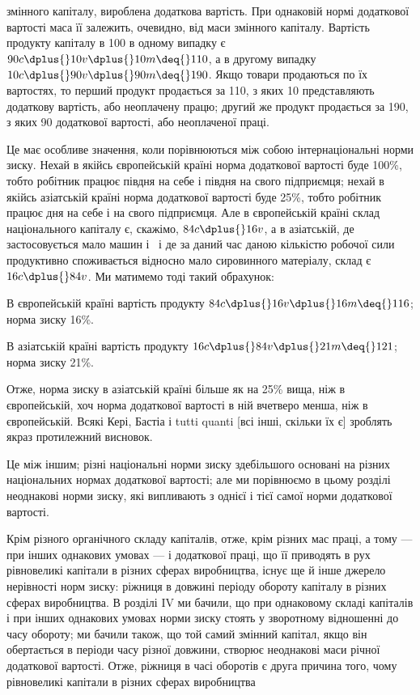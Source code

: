 \parcont{}  %
змінного капіталу, вироблена додаткова вартість. При однаковій
нормі додаткової вартості маса її залежить, очевидно, від маси
змінного капіталу. Вартість продукту капіталу в 100 в одному
випадку є $90 c \dplus{} 10 v \dplus{} 10 m \deq{} 110$, а в другому випадку $10 c \dplus{} 90 v \dplus{} 90 m \deq{} 190$. Якщо товари
продаються по їх вартостях,
то перший продукт продається за 110, з яких 10 представляють додаткову вартість, або неоплачену
працю; другий же
продукт продається за 190, з яких 90 додаткової вартості, або
неоплаченої праці.

Це має особливе значення, коли порівнюються між собою
інтернаціональні норми зиску. Нехай в якійсь європейській країні
норма додаткової вартості буде 100\%, тобто робітник працює
півдня на себе і півдня на свого підприємця; нехай в якійсь
азіатській країні норма додаткової вартості буде 25\%, тобто робітник працює  дня на себе і  на
свого підприємця. Але
в європейській країні склад національного капіталу є, скажімо,
$84 c \dplus{} 16 v$, а в азіатській, де застосовується мало машин і~
і де за даний час даною кількістю робочої сили продуктивно
споживається відносно мало сировинного матеріалу, склад є
$16 c \dplus{} 84 v$. Ми матимемо тоді такий обрахунок:

В європейській країні вартість продукту \deq{} $84 c \dplus{} 16 v \dplus{} 16 m \deq{} 116$; норма зиску \deq{}  \deq{} 16\%.

В азіатській країні вартість продукту \deq{} $16 c \dplus{} 84 v \dplus{} 21 m \deq{} 121$; норма зиску \deq{}  \deq{} 21\%.

Отже, норма зиску в азіатській країні більше як на 25\% вища, ніж в європейській, хоч норма
додаткової вартості в ній
вчетверо менша, ніж в європейській. Всякі Кері, Бастіа і tutti quanti [всі інші, скільки їх є]
зроблять якраз протилежний висновок.

Це між іншим; різні національні норми зиску здебільшого
основані на різних національних нормах додаткової вартості;
але ми порівнюємо в цьому розділі неоднакові норми зиску,
які випливають з однієї і тієї самої норми додаткової вартості.

Крім різного органічного складу капіталів, отже, крім різних
мас праці, а тому — при інших однакових умовах — і додаткової
праці, що її приводять в рух рівновеликі капітали в різних сферах
виробництва, існує ще й інше джерело нерівності норм зиску:
ріжниця в довжині періоду обороту капіталу в різних сферах
виробництва. В розділі IV ми бачили, що при однаковому складі
капіталів і при інших однакових умовах норми зиску стоять у зворотному відношенні до часу обороту;
ми бачили також, що
той самий змінний капітал, якщо він обертається в періоди
часу різної довжини, створює неоднакові маси річної додаткової вартості. Отже, ріжниця в часі
оборотів є друга причина
того, чому рівновеликі капітали в різних сферах виробництва
\parbreak{}  %
